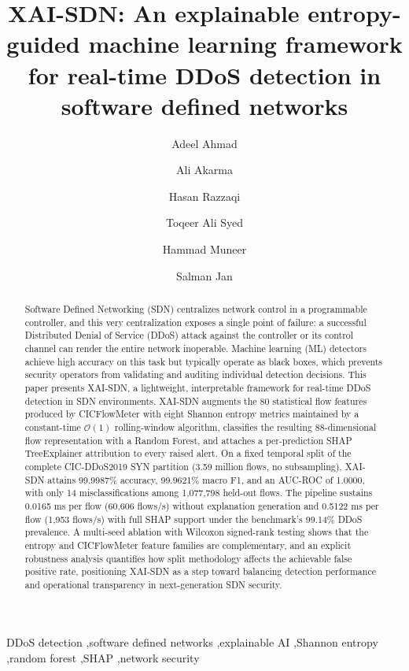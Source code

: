 ﻿\documentclass[review,12pt]{elsarticle}
\begin{document}
\begin{frontmatter}

\title{XAI-SDN: An explainable entropy-guided machine learning framework for real-time DDoS detection in software defined networks}

\author[a]{Adeel Ahmad}
\author[a]{Ali Akarma}
\author[b]{Hasan Razzaqi}
\author[a]{Toqeer Ali Syed}
\author[c]{Hammad Muneer}
\author[b]{Salman Jan}



\begin{abstract}
Software Defined Networking (SDN) centralizes network control in a programmable controller, and this very centralization exposes a single point of failure: a successful Distributed Denial of Service (DDoS) attack against the controller or its control channel can render the entire network inoperable. Machine learning (ML) detectors achieve high accuracy on this task but typically operate as black boxes, which prevents security operators from validating and auditing individual detection decisions. This paper presents XAI-SDN, a lightweight, interpretable framework for real-time DDoS detection in SDN environments. XAI-SDN augments the 80 statistical flow features produced by CICFlowMeter with eight Shannon entropy metrics maintained by a constant-time $\mathcal{O}(1)$ rolling-window algorithm, classifies the resulting 88-dimensional flow representation with a Random Forest, and attaches a per-prediction SHAP TreeExplainer attribution to every raised alert. On a fixed temporal split of the complete CIC-DDoS2019 SYN partition (3.59 million flows, no subsampling), XAI-SDN attains 99.9987\% accuracy, 99.9621\% macro F1, and an AUC-ROC of 1.0000, with only 14 misclassifications among 1,077,798 held-out flows. The pipeline sustains 0.0165 ms per flow (60,606 flows/s) without explanation generation and 0.5122 ms per flow (1,953 flows/s) with full SHAP support under the benchmark's 99.14\% DDoS prevalence. A multi-seed ablation with Wilcoxon signed-rank testing shows that the entropy and CICFlowMeter feature families are complementary, and an explicit robustness analysis quantifies how split methodology affects the achievable false positive rate, positioning XAI-SDN as a step toward balancing detection performance and operational transparency in next-generation SDN security.
\end{abstract}

\begin{keyword}
DDoS detection \sep software defined networks \sep explainable AI \sep Shannon entropy \sep random forest \sep SHAP \sep network security
\end{keyword}

\end{frontmatter}
\end{document}
